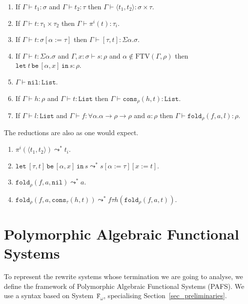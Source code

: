 \documentclass[a4paper,UKenglish,cleveref,autoref,numberwithinsect]{lipics-v2019}
\theoremstyle{definition}
\newcommand{\Fomega}{\mathtt{F}_\omega}
\newcommand{\arrtype}{\rightarrow}
\newcommand{\subst}[2]{#1:=#2}
\newcommand{\pair}[2]{\langle #1,#2 \rangle}
\newcommand{\expair}[2]{[#1,#2]}
\newcommand{\FTV}{\mathrm{FTV}}
\newcommand{\proves}{\vdash}
\newcommand{\List}{\mathtt{List}}
\newcommand{\nil}{\mathtt{nil}}
\newcommand{\cons}{\mathtt{cons}}
\newcommand{\fold}{\mathtt{fold}}
\newcommand{\xlet}[4]{\mathtt{let}_{#1}\,#2\,\mathtt{be}\,[#3]\,\mathtt{in}\,#4}
\begin{document}
\begin{lemma}\label{lem:encodings_types}
  \begin{enumerate}
  \item If $\Gamma \proves t_1 : \sigma$ and $\Gamma \proves t_2 :
    \tau$ then $\Gamma \proves \pair{t_1}{t_2} : \sigma \times \tau$.
  \item If $\Gamma \proves t : \tau_1 \times \tau_2$ then $\Gamma
    \proves \pi^i(t) : \tau_i$.
  \item If $\Gamma \proves t : \sigma[\subst{\alpha}{\tau}]$ then
    $\Gamma \proves \expair{\tau}{t} : \Sigma \alpha . \sigma$.
  \item If $\Gamma \proves t : \Sigma \alpha . \sigma$ and
    $\Gamma,x:\sigma \proves s : \rho$ and $\alpha \notin
    \FTV(\Gamma,\rho)$ then $\xlet{}{t}{\alpha,x}{s} : \rho$.
  \item $\Gamma \proves \nil : \List$.
  \item If $\Gamma \proves h : \rho$ and $\Gamma \proves t : \List$
    then $\Gamma \proves \cons_\rho(h,t) : \List$.
  \item If $\Gamma \proves l : \List$ and $\Gamma \proves f : \forall
    \alpha . \alpha \arrtype \rho \arrtype \rho$ and $a : \rho$ then
    $\Gamma \proves \fold_\rho(f,a,l) : \rho$.
  \end{enumerate}
\end{lemma}

The reductions are also as one would expect.

\begin{lemma}\label{lem:encodings_reduce}
  \begin{enumerate}
  \item $\pi^i(\pair{t_1}{t_2}) \leadsto^* t_i$.
  \item $\xlet{}{\expair{\tau}{t}}{\alpha,x}{s} \leadsto^*
    s[\subst{\alpha}{\tau}][\subst{x}{t}]$.
  \item $\fold_\rho(f,a,\nil) \leadsto^* a$.
  \item $\fold_\rho(f,a,\cons_\tau(h,t)) \leadsto^* f \tau h
    (\fold_\rho(f,a,t))$.
  \end{enumerate}
\end{lemma}

\section{Polymorphic Algebraic Functional Systems}\label{sec_systems}

To represent the rewrite systems whose termination we are going to
analyse, we define the framework of Polymorphic Algebraic Functional
Systems (PAFS). We use a syntax based on System~$\Fomega$,
specialising Section~\ref{sec_preliminaries}.
\end{document}
